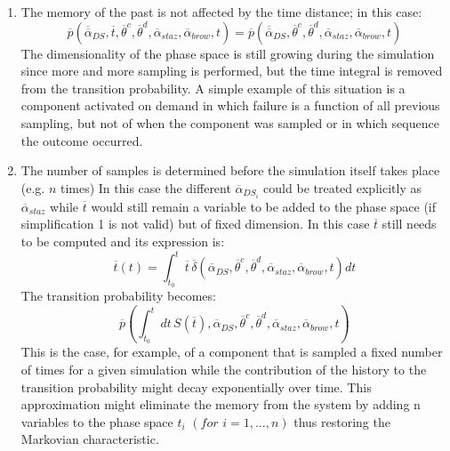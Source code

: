 \begin{enumerate}
  \item The memory of the past is not affected by the time distance; in this case:
  \begin{equation}
   \overline{p}\left ( \overline{\overline{\alpha}}_{DS},\overline{t},\overline{\theta}^{c},\overline{\theta}^{d},\overline{\alpha}_{staz},\overline{\alpha}_{brow},t  \right ) =  \overline{p}\left ( \overline{\overline{\alpha}}_{DS},\overline{\theta}^{c},\overline{\theta}^{d},\overline{\alpha}_{staz},\overline{\alpha}_{brow},t  \right )
  \end{equation}
  The dimensionality of the phase space is still growing during the simulation since more and more sampling is 
  performed, but the time integral is removed from the transition probability. A simple example of this situation is 
  a component activated on demand in which failure is a function of all previous sampling, but not of when the 
  component was sampled or in which sequence the outcome occurred.
  \item  The number of samples is determined before the simulation itself takes place (e.g. $n$ times) In this case 
  the different $\overline{\alpha}_{DS_{i}}$ could be treated explicitly as $\overline{\alpha}_{staz}$   while 
  $\overline{t}$ would still remain a variable to be added to the phase space (if simplification 1 is not valid) but of 
  fixed dimension. In this case $\overline{t}$ still needs to be computed and its expression is:
  \begin{equation}
   \overline{t} \left ( t \right ) = \int_{t_{0}}^{t} \overline{t}  \, \overline{\delta }\left ( \overline{\alpha }_{DS}, 
   \overline{\theta}^{c},\overline{\theta}^{d},\overline{\alpha}_{staz},\overline{\alpha}_{brow},t \right )  dt
  \end{equation}
  The transition probability becomes:
  \begin{equation}
     \overline{p}\left ( \int_{t_{0}}^{t} dt\, S\left ( \overline{t} \right ), \overline{\alpha}_{DS}, \overline{\theta}^{c},
     \overline{\theta}^{d},\overline{\alpha}_{staz},\overline{\alpha}_{brow},t \right )
  \end{equation}
  This is the case, for example, of a component that is sampled a fixed number of times for a given simulation 
  while the contribution of the history to the transition probability might decay exponentially over time. This 
  approximation might eliminate the memory from the system by adding n variables to the phase space $t_{i} \, \, 
  (for \, \, i=1,...,n)$ thus restoring the Markovian characteristic.

\end{enumerate}
